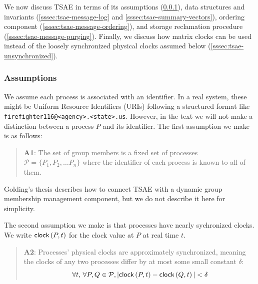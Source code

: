 \documentclass[]             %
{NASA}                       %
\theoremstyle{definition}
\begin{document}
We now discuss TSAE in terms of its assumptions
(\ref{sssec:tsae-assumptions}), data structures and invariants
(\ref{sssec:tsae-message-log} and \ref{sssec:tsae-summary-vectors}),
ordering component (\ref{sssec:tsae-message-ordering}), and storage
reclamation procedure (\ref{sssec:tsae-message-purging}). Finally, we
discuss how matrix clocks can be used instead of the loosely
synchronized physical clocks assumed below
(\ref{sssec:tsae-unsynchronized}).

\subsubsection{Assumptions}
\label{sssec:tsae-assumptions}
We assume each process is associated with an identifier. In a real
system, these might be Uniform Resource Identifiers (URIs)
\cite{rfc3986} following a structured format like
\texttt{firefighter116@<agency>.<state>.us}. However, in the text we
will not make a distinction between a process $P$ and its
identifier. The first assumption we make is as follows:
\begin{quote}
  \textbf{A1}: The set of group members is a fixed set of processes
  $\mathcal{P} = \{P_1, P_2, \ldots P_n\}$ where the identifier of
  each process is known to all of them.
\end{quote}

Golding's thesis describes how to connect TSAE with a dynamic group
membership management component, but we do not describe it here for
simplicity.

The second assumption we make is that processes have nearly
sychronized clocks. We write $\textsf{clock}\left(P, t\right)$ for the clock value at $P$
at real time $t$.
\begin{quote}
  \textbf{A2}: Processes' physical clocks are approximately
  synchronized, meaning the clocks of any two processes differ by at
  most some small constant $\delta$:
  \[ \forall t,\, \forall P, Q \in \mathcal{P}, |\textsf{clock}\left(P, t\right) - \textsf{clock}\left(Q, t\right)| < \delta
  \]
\end{quote}
\end{document}
